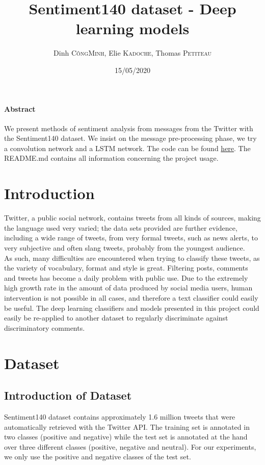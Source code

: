 \documentclass{article}
\title{Sentiment140 dataset - Deep learning models}
\author{Dinh \textsc{CôngMinh}, Elie \textsc{Kadoche}, Thomas \textsc{Petiteau}}
\date{15/05/2020}
\begin{document}
\maketitle

\paragraph{Abstract}
We present methods of sentiment analysis from messages from the Twitter with the Sentiment140 dataset.
We insist on the message pre-processing phase, we try a convolution network and a LSTM network. The code can be found \href{https://github.com/XanX3601/deep_sentiment140.git}{here}.
The README.md contains all information concerning the project usage.

\section{Introduction}

Twitter, a public social network, contains tweets from all kinds of sources, making the language used very varied; the data sets provided are further evidence, including a wide range of tweets, from very formal tweets, such as news alerts, to very subjective and often slang tweets, probably from the youngest audience.\\

As such, many difficulties are encountered when trying to classify these tweets, as the variety of vocabulary, format and style is great. Filtering posts, comments and tweets has become a daily problem with public use. Due to the extremely high growth rate in the amount of data produced by social media users, human intervention is not possible in all cases, and therefore a text classifier could easily be useful. The deep learning classifiers and models presented in this project could easily be re-applied to another dataset to regularly discriminate against discriminatory comments.

\section{Dataset}

\subsection{Introduction of Dataset}

Sentiment140 dataset contains approximately 1.6 million tweets that were automatically retrieved with the Twitter API. 
The training set is annotated in two classes (positive and negative) while the test set is annotated at the hand over three different classes (positive, negative and neutral).
For our experiments, we only use the positive and negative classes of the test set.\\
\end{document}
